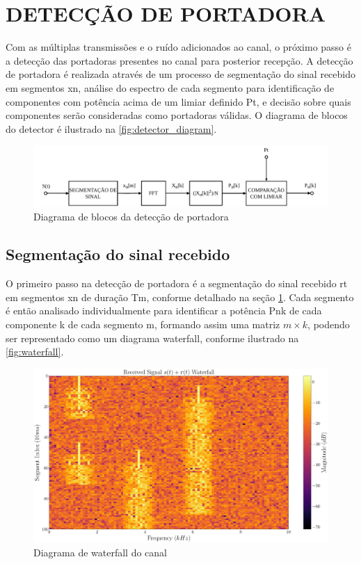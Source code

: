 \section{DETECÇÃO DE PORTADORA}\label{sec:detector}

Com as múltiplas transmissões e o ruído adicionados ao canal, o próximo passo é a detecção das portadoras presentes no canal para posterior recepção. A detecção de portadora é realizada através de um processo de segmentação do sinal recebido em segmentos \gls{xn}, análise do espectro de cada segmento para identificação de componentes com potência acima de um limiar definido \gls{Pt}, e decisão sobre quais componentes serão consideradas como portadoras válidas. O diagrama de blocos do detector é ilustrado na \autoref{fig:detector_diagram}.

\begin{figure}[H]
	\centering
	\caption{Diagrama de blocos da detecção de portadora}\label{fig:detector_diagram}
	\includegraphics[width=\linewidth]{assets/diagrams/detector.pdf}
\end{figure}

\subsection{Segmentação do sinal recebido}\label{sec:segmentacao}

O primeiro passo na detecção de portadora é a segmentação do sinal recebido \gls{rt} em segmentos \gls{xn} de duração \gls{Tm}, conforme detalhado na seção \ref{sec:detector}. Cada segmento é então analisado individualmente para identificar a potência \gls{Pnk} de cada componente \gls{k} de cada segmento \gls{m}, formando assim uma matriz $m \times k$, podendo ser representado como um diagrama waterfall, conforme ilustrado na \autoref{fig:waterfall}.

\begin{figure}[H]
	\centering
	\caption{Diagrama de waterfall do canal}\label{fig:waterfall}
	\includegraphics[width=\linewidth]{assets/cap3/example_detector_waterfall.pdf}
\end{figure}

